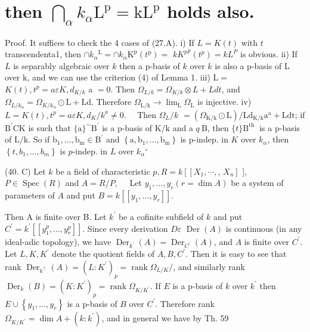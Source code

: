 \section{then $\bigcap_{\alpha} k_{\alpha} \mathrm{L}^{\mathrm{p}}=\mathrm{kL}^{\mathrm{p}}$ holds also.}
Proof. It suffices to check the 4 cases of (27.A). i) If $L=K(t)$ with $t$ transcendenta1, then $\cap k_{\alpha}{ }^{\mathrm{L}}=\cap k_{\alpha} \mathrm{K}^{\mathrm{p}}\left(t^{\mathrm{p}}\right)=$ ${k K^{p}}^{p}\left(t^{p}\right)=k L^{P}$ is obvious. ii) If $L$ is separably algebraic over $k$ then a p-basis of $k$ over $k$ is also a p-basis of L over $\mathrm{k}$, and we can use the criterion (4) of Lemma 1. iii) $\mathrm{L}=$ $K(t), t^{p}=a \varepsilon K, d_{K / k}$ a $=0$. Then $\Omega_{L / k}=\Omega_{K / k} \otimes L+L d t$, and $\Omega_{L / k_{\alpha}}=\Omega_{K / k_{\alpha}} \odot \mathrm{L}+\mathrm{Ld}$. Therefore $\Omega_{\mathrm{L} / \mathrm{k}} \rightarrow \lim _{\mathrm{L}} \Omega_{\mathrm{L}}$ is injective. iv) $L=K(t), t^{p}=a \varepsilon K, d_{K} / k^{a} \neq 0 . \quad$ Then $\Omega_{L} / k$ $=\left(\Omega_{\mathrm{K} / \mathrm{k}} \odot \mathrm{L}\right) / \mathrm{Ld}_{\mathrm{K} / \mathrm{k}} \mathrm{a}^{\mathrm{a}}+\mathrm{Ldt}$; if $\mathrm{B}^{\prime} \mathrm{CK}$ is such that $\{\mathrm{a}\}^{\sim} \mathrm{B}^{\prime}$ is a p-basis of $\mathrm{K} / \mathrm{k}$ and a $q \mathrm{~B}$, then $\{t\} \mathrm{B}^{\text {th }}$ is a p-basis of $\mathrm{L} / \mathrm{k}$. So if $\mathrm{b}_{1}, \ldots, \mathrm{b}_{\mathrm{m}} \in \mathrm{B}^{\prime}$ and $\left\{\mathrm{a}, \mathrm{b}_{1}, \ldots, \mathrm{b}_{\mathrm{m}}\right\}$ is $\mathrm{p}$-indep. in $K$ over $k_{\alpha}$, then $\left\{t, b_{1}, \ldots, b_{m}\right\}$ is $p$-indep. in $L$ over $k_{\alpha}{ }^{\circ}$

(40. C) Let $k$ be a field of characteristic $p, R=k\left[\left[X_{1}, \cdots,\right.\right.$, $\left.X_{n}\right]$ ], $P \in \operatorname{Spec}(R)$ and $A=R / P, \quad$ Let $y_{1}, \ldots, y_{r}(r=\operatorname{dim} A)$ be a system of parameters of $A$ and put $B=k\left[\left[y_{1}, \ldots, y_{r}\right]\right]$.

Then A is finite over B. Let $k^{\prime}$ be a cofinite subfield of $k$ and put $C^{\prime}=k^{\prime}\left[\left[y_{1}^{p}, \ldots, y_{r}^{p}\right]\right]$. Since every derivation $D \varepsilon$ $\operatorname{Der}(A)$ is continuous (in any ideal-adic topology), we have $\operatorname{Der}_{k^{\prime}}(A)=\operatorname{Der}_{C^{\prime}}(A)$, and $A$ is finite over $C^{\prime}$. Let $L, K, K^{\prime}$ denote the quotient fields of $A, B, C^{\prime}$. Then it is easy to see that rank $\operatorname{Der}_{k^{\top}}(A)=\left(L: K^{\prime}\right)_{p}=\operatorname{rank} \Omega_{L / K} /$, and similarly rank $\operatorname{Der}_{k}(B)=\left(K: K^{\prime}\right)_{p}=\operatorname{rank} \Omega_{K / K^{\prime}}$. If $E$ is a p-basis of $k$ over $k^{\prime}$ then $E \cup\left\{y_{1}, \ldots, y_{r}\right\}$ is a p-basis of $B$ over $C^{\prime}$. Therefore rank $\Omega_{K / K^{\prime}}=\operatorname{dim} A+\left(k: k^{\prime}\right)$, and in general we have by Th. 59

